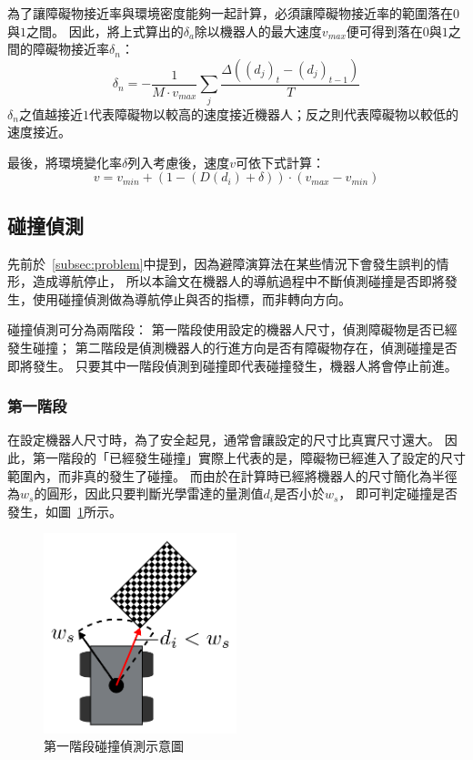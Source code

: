 為了讓障礙物接近率與環境密度能夠一起計算，必須讓障礙物接近率的範圍落在$0$與$1$之間。
因此，將上式算出的$\delta_a$除以機器人的最大速度$v_{max}$便可得到落在$0$與$1$之間的障礙物接近率$\delta_n$：
\begin{equation}
	\delta_n = -\frac{1}{M \cdot v_{max}}\sum_{j}\frac{\Delta((d_j)_t - (d_j)_{t-1})}{T}
\end{equation}
$\delta_n$之值越接近$1$代表障礙物以較高的速度接近機器人；反之則代表障礙物以較低的速度接近。

最後，將環境變化率$\delta$列入考慮後，速度$v$可依下式計算：
\begin{equation}
	v = v_{min} + (1-(D(d_i)+\delta)) \cdot (v_{max} - v_{min})
	\label{e:speed_control}
\end{equation}

\subsection{碰撞偵測}
先前於~\ref{subsec:problem}中提到，因為避障演算法在某些情況下會發生誤判的情形，造成導航停止，
所以本論文在機器人的導航過程中不斷偵測碰撞是否即將發生，使用碰撞偵測做為導航停止與否的指標，而非轉向方向。

碰撞偵測可分為兩階段：
第一階段使用設定的機器人尺寸，偵測障礙物是否已經發生碰撞；
第二階段是偵測機器人的行進方向是否有障礙物存在，偵測碰撞是否即將發生。
只要其中一階段偵測到碰撞即代表碰撞發生，機器人將會停止前進。

\subsubsection{第一階段}
在設定機器人尺寸時，為了安全起見，通常會讓設定的尺寸比真實尺寸還大。
因此，第一階段的「已經發生碰撞」實際上代表的是，障礙物已經進入了設定的尺寸範圍內，而非真的發生了碰撞。
而由於在計算時已經將機器人的尺寸簡化為半徑為$w_s$的圓形，因此只要判斷光學雷達的量測值$d_i$是否小於$w_s$，
即可判定碰撞是否發生，如圖~\ref{f:collision_1stage}所示。
\begin{figure}[h!]
	\centering
	\includegraphics[width=0.5\textwidth]{figures/algorithm/collision_1stage}
	\caption{第一階段碰撞偵測示意圖}
	\label{f:collision_1stage}
\end{figure}

